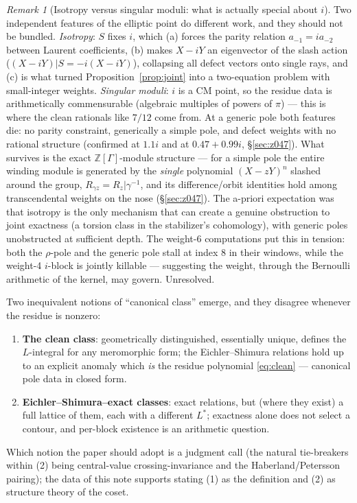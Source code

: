 \documentclass[11pt]{article}
\theoremstyle{definition}
\theoremstyle{remark}
\newtheorem{remark}{Remark}
\newcommand{\ZZ}{\mathbb{Z}}
\begin{document}
\begin{remark}[Isotropy versus singular moduli: what is actually special about $i$]\label{rem:iso}
Two independent features of the elliptic point do different work, and they should not be
bundled.  \emph{Isotropy}: $S$ fixes $i$, which (a) forces the parity relation
$a_{-1}=ia_{-2}$ between Laurent coefficients, (b) makes $X-iY$ an eigenvector of the
slash action ($(X-iY)|S=-i(X-iY)$), collapsing all defect vectors onto single rays, and
(c) is what turned Proposition~\ref{prop:joint} into a two-equation problem with
small-integer weights.  \emph{Singular moduli}: $i$ is a CM point, so the residue data is
arithmetically commensurable (algebraic multiples of powers of $\pi$) --- this is where
the clean rationals like $7/12$ come from.  At a generic pole both features die: no
parity constraint, generically a simple pole, and defect weights with no rational
structure (confirmed at $1.1i$ and at $0.47+0.99i$, \S\ref{sec:z047}).  What survives is
the exact $\ZZ[\Gamma]$-module structure --- for a simple pole the entire winding module
is generated by the \emph{single} polynomial $(X-zY)^n$ slashed around the group,
$R_{\gamma z}=R_z|\gamma^{-1}$, and its difference/orbit identities hold among
transcendental weights on the nose (\S\ref{sec:z047}).  The a-priori expectation was that
isotropy is the only mechanism that can create a genuine obstruction to joint exactness
(a torsion class in the stabilizer's cohomology), with generic poles unobstructed at
sufficient depth.  The weight-6 computations put this in tension: both the $\rho$-pole
and the generic pole stall at index $8$ in their windows, while the weight-4 $i$-block is
jointly killable --- suggesting the weight, through the Bernoulli arithmetic of the
kernel, may govern.  Unresolved.
\end{remark}

Two inequivalent notions of ``canonical class'' emerge, and they disagree whenever the
residue is nonzero:
\begin{enumerate}
\item \textbf{The clean class}: geometrically distinguished, essentially unique, defines
the $L$-integral for any meromorphic form; the Eichler--Shimura relations hold up to an
explicit anomaly which \emph{is} the residue polynomial \eqref{eq:clean} --- canonical
pole data in closed form.
\item \textbf{Eichler--Shimura--exact classes}: exact relations, but (where they exist) a
full lattice of them, each with a different $L^*$; exactness alone does not select a
contour, and per-block existence is an arithmetic question.
\end{enumerate}
Which notion the paper should adopt is a judgment call (the natural tie-breakers within
(2) being central-value crossing-invariance and the Haberland/Petersson pairing); the
data of this note supports stating (1) as the definition and (2) as structure theory of
the coset.
\end{document}
